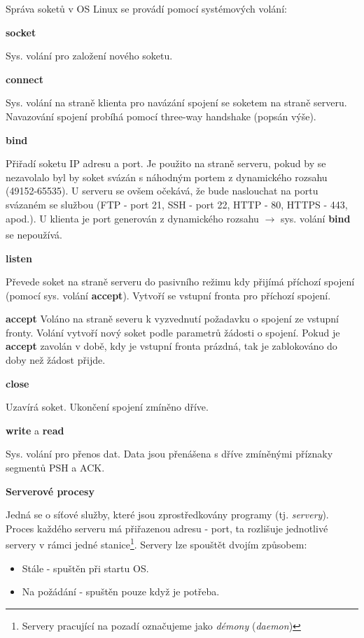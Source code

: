 Správa soketů v OS Linux se provádí pomocí systémových volání:

\vspace{0,5cm}
\textbf{socket}

Sys. volání pro založení nového soketu.

\vspace{0,5cm}
\textbf{connect}

Sys. volání na straně klienta pro navázání spojení se soketem na straně serveru. Navazování spojení probíhá pomocí three-way handshake (popsán výše).

\vspace{0,5cm}
\textbf{bind}

Přiřadí soketu IP adresu a port. Je použito na straně serveru, pokud by se nezavolalo byl by soket svázán s náhodným portem z dynamického rozsahu (49152-65535). U serveru se ovšem očekává, že bude naslouchat na portu svázaném se službou (FTP - port 21, SSH - port 22, HTTP - 80, HTTPS - 443, apod.). U klienta je port generován z dynamického rozsahu $\xrightarrow[]{}$ sys. volání \textbf{bind} se nepoužívá.  

\vspace{0,5cm}
\textbf{listen}

Převede soket na straně serveru do pasivního režimu kdy přijímá příchozí spojení (pomocí sys. volání \textbf{accept}). Vytvoří se vstupní fronta pro příchozí spojení.  

\vspace{0,5cm}
\textbf{accept}
Voláno na straně severu k vyzvednutí požadavku o spojení ze vstupní fronty. Volání vytvoří nový soket podle parametrů žádosti o spojení. Pokud je \textbf{accept} zavolán v době, kdy je vstupní fronta prázdná, tak je zablokováno do doby než žádost přijde.

\vspace{0,5cm}
\textbf{close}

Uzavírá soket. Ukončení spojení zmíněno dříve.

\vspace{0,5cm}
\textbf{write} a \textbf{read}

Sys. volání pro přenos dat. Data jsou přenášena s dříve zmíněnými příznaky segmentů PSH a ACK.

\newpage

\begin{Large} 
    \textbf{Serverové procesy}
\end{Large}

Jedná se o síťové služby, které jsou zprostředkovány programy (tj. \textit{servery}). Proces každého serveru má přiřazenou adresu - port, ta rozlišuje jednotlivé servery v rámci jedné stanice\footnote{Servery pracující na pozadí označujeme jako \textit{démony} (\textit{daemon})}. Servery lze spouštět dvojím způsobem:
\begin{itemize}
    \item Stále - spuštěn při startu OS.
    \item Na požádání - spuštěn pouze když je potřeba.
\end{itemize}


